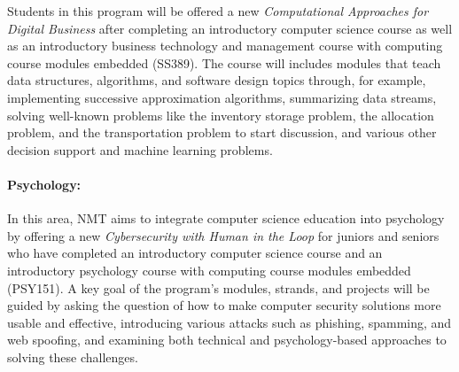 Students in this program will be offered a new \textit{Computational Approaches for Digital Business} after completing an introductory computer science course
as well as an introductory business technology and management course with computing course modules embedded (SS389). The course will includes modules that teach data structures, algorithms, and software design topics through, for example, implementing successive approximation algorithms, 
summarizing data streams, %
solving well-known problems like the inventory storage problem, the allocation problem, and the transportation problem to start discussion, and various other decision support and machine learning problems.

\paragraph{Psychology:}
In this area, NMT aims to integrate computer science education into psychology by offering a new \textit{Cybersecurity with Human in the Loop} for juniors and seniors who have completed an introductory computer science course and an introductory psychology course with computing course modules embedded (PSY151). 
A key goal of the program's modules, strands, and projects will be guided by asking the question of how to make computer security solutions more usable and effective, introducing various attacks such as phishing, spamming, and web spoofing, and examining both technical and psychology-based approaches to solving these challenges.
